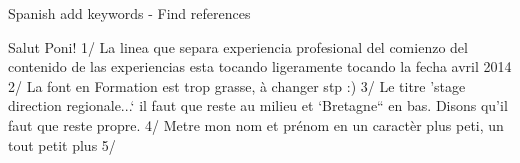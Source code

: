 Spanish add keywords
- Find references


Salut Poni! 
1/ La linea que separa experiencia profesional del comienzo del contenido de las experiencias esta tocando ligeramente tocando la fecha avril 2014
2/ La font en Formation est trop grasse, à changer stp :)
3/ Le titre 'stage direction regionale...` il faut que reste au milieu et `Bretagne`` en bas. Disons qu'il faut que reste propre. 
4/ Metre mon nom et prénom en un caractèr plus peti, un tout petit plus
5/ 

